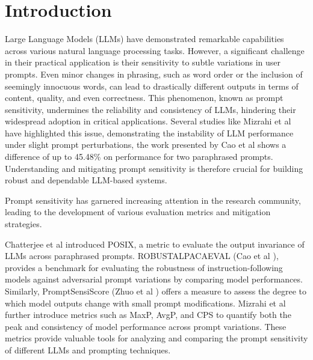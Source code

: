 \documentclass[fleqn,moreauthors,10pt]{ds_report}
\affiliation{\textit{Advisors: }}
\begin{document}
\flushbottom 

\maketitle 

\thispagestyle{empty} 


\section*{Introduction}
Large Language Models (LLMs) have demonstrated remarkable capabilities across various natural language processing tasks. However, a significant challenge in their practical application is their sensitivity to subtle variations in user prompts. Even minor changes in phrasing, such as word order or the inclusion of seemingly innocuous words, can lead to drastically different outputs in terms of content, quality, and even correctness. This phenomenon, known as prompt sensitivity, undermines the reliability and consistency of LLMs, hindering their widespread adoption in critical applications. Several studies like Mizrahi et al \cite{mizrahi-etal-2024-state} have highlighted this issue, demonstrating the instability of LLM performance under slight prompt perturbations, the work presented by Cao et al \cite{cao2024worstpromptperformancelarge} shows a difference of up to 45.48\% on performance for two paraphrased prompts. Understanding and mitigating prompt sensitivity is therefore crucial for building robust and dependable LLM-based systems.

Prompt sensitivity has garnered increasing attention in the research community, leading to the development of various evaluation metrics and mitigation strategies.

Chatterjee et al \cite{chatterjee-etal-2024-posix} introduced POSIX, a metric to evaluate the output invariance of LLMs across paraphrased prompts. ROBUSTALPACAEVAL (Cao et al \cite{cao2024worstpromptperformancelarge}), provides a benchmark for evaluating the robustness of instruction-following models against adversarial prompt variations by comparing model performances. Similarly, PromptSensiScore (Zhuo et al \cite{zhuo2024prosa}) offers a measure to assess the degree to which model outputs change with small prompt modifications. Mizrahi et al \cite{mizrahi-etal-2024-state} further introduce metrics such as MaxP, AvgP, and CPS to quantify both the peak and consistency of model performance across prompt variations. These metrics provide valuable tools for analyzing and comparing the prompt sensitivity of different LLMs and prompting techniques. 
\end{document}

